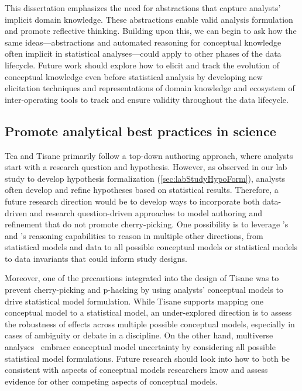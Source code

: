 This dissertation emphasizes the need for abstractions that capture analysts'
implicit domain knowledge. These abstractions enable valid analysis formulation
and promote reflective thinking. Building upon this, we can begin to ask how the
same ideas---abstractions and automated reasoning for conceptual knowledge often
implicit in statistical analyses---could apply to other phases of the data
lifecycle. Future work should explore how to elicit and track the evolution of
conceptual knowledge even before statistical analysis by developing new
elicitation techniques and representations of domain knowledge and ecosystem of
inter-operating tools to track and ensure validity throughout the data lifecycle. 


\subsection{Promote analytical best practices in science}
Tea and Tisane primarily follow a top-down authoring approach, where analysts
start with a research question and hypothesis. However, as observed in our lab
study to develop hypothesis formalization (\autoref{sec:labStudyHypoForm}),
analysts often develop and refine hypotheses based on statistical results.
Therefore, a future research direction would be to develop ways to incorporate
both data-driven and research question-driven approaches to model authoring and
refinement that do not promote cherry-picking. One possibility is to leverage
\tea's and \tisane's reasoning capabilities to reason in multiple other
directions, from statistical models and data to all possible conceptual models
or statistical models to data invariants that could inform study designs.

Moreover, one of the precautions integrated into the design of Tisane was to prevent
cherry-picking and p-hacking by using analysts' conceptual models to drive
statistical model formulation. While Tisane supports mapping one conceptual
model to a statistical model, an under-explored direction is to assess the
robustness of effects across multiple possible conceptual models, especially in
cases of ambiguity or debate in a discipline. On the other hand, multiverse
analyses~\cite{} embrace conceptual model uncertainty by considering all
possible statistical model formulations. Future research should look into how to
both be consistent with aspects of conceptual models researchers know and assess
evidence for other competing aspects of conceptual models.


